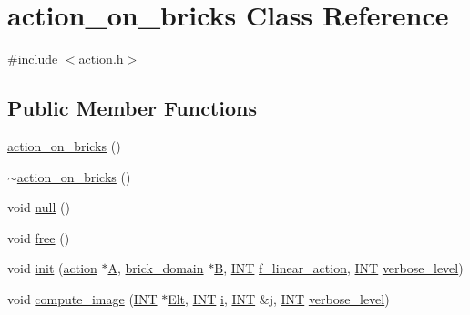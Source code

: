 \hypertarget{classaction__on__bricks}{}\section{action\+\_\+on\+\_\+bricks Class Reference}
\label{classaction__on__bricks}


{\ttfamily \#include $<$action.\+h$>$}

\subsection*{Public Member Functions}
\begin{DoxyCompactItemize}
\item 
\mbox{\hyperlink{classaction__on__bricks_acbeed145cd7dde787b46f853ad6a2756}{action\+\_\+on\+\_\+bricks}} ()
\item 
\mbox{\hyperlink{classaction__on__bricks_ae1d204d0f2f7a75083d4bd1d95f64274}{$\sim$action\+\_\+on\+\_\+bricks}} ()
\item 
void \mbox{\hyperlink{classaction__on__bricks_ac44ad85d9ca6448db2a79dd27e735561}{null}} ()
\item 
void \mbox{\hyperlink{classaction__on__bricks_aa9e87a7771150f4d46ba95e09134a8c2}{free}} ()
\item 
void \mbox{\hyperlink{classaction__on__bricks_ab45251c55c3cfb3b2f191507352d475b}{init}} (\mbox{\hyperlink{classaction}{action}} $\ast$\mbox{\hyperlink{classaction__on__bricks_a8c8eb0a2bd23bf5825449af36f8922c5}{A}}, \mbox{\hyperlink{classbrick__domain}{brick\+\_\+domain}} $\ast$\mbox{\hyperlink{classaction__on__bricks_a840d4436d0c88405d583f4545f86620a}{B}}, \mbox{\hyperlink{galois_8h_a09fddde158a3a20bd2dcadb609de11dc}{I\+NT}} \mbox{\hyperlink{classaction__on__bricks_a88b884b19c838a2650a40331c949657b}{f\+\_\+linear\+\_\+action}}, \mbox{\hyperlink{galois_8h_a09fddde158a3a20bd2dcadb609de11dc}{I\+NT}} \mbox{\hyperlink{simeon_8_c_a818073fbcc2f439e7c56952f67386122}{verbose\+\_\+level}})
\item 
void \mbox{\hyperlink{classaction__on__bricks_ababbf964af94938e726b7fa44424addb}{compute\+\_\+image}} (\mbox{\hyperlink{galois_8h_a09fddde158a3a20bd2dcadb609de11dc}{I\+NT}} $\ast$\mbox{\hyperlink{simeon_8_c_aec1406935bdb1fee3561fcb840964100}{Elt}}, \mbox{\hyperlink{galois_8h_a09fddde158a3a20bd2dcadb609de11dc}{I\+NT}} \mbox{\hyperlink{alphabet2_8_c_acb559820d9ca11295b4500f179ef6392}{i}}, \mbox{\hyperlink{galois_8h_a09fddde158a3a20bd2dcadb609de11dc}{I\+NT}} \&\mbox{\hyperlink{alphabet2_8_c_a37d972ae0b47b9099e30983131d31916}{j}}, \mbox{\hyperlink{galois_8h_a09fddde158a3a20bd2dcadb609de11dc}{I\+NT}} \mbox{\hyperlink{simeon_8_c_a818073fbcc2f439e7c56952f67386122}{verbose\+\_\+level}})

\end{DoxyCompactItemize}
